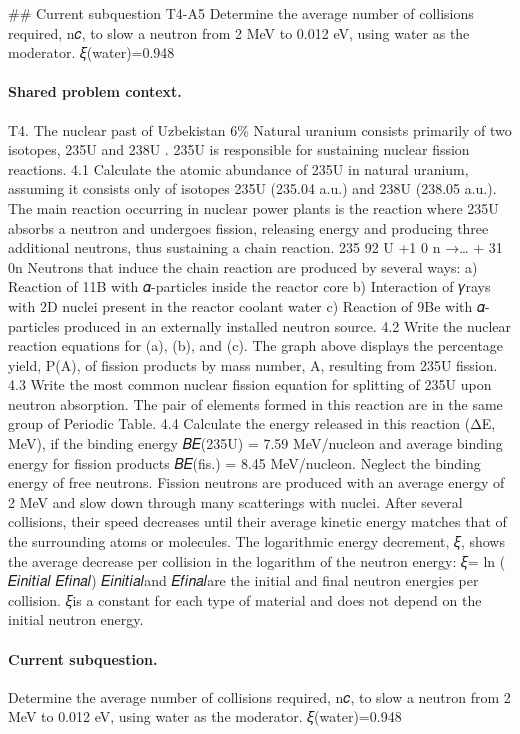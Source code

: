\#\# Current subquestion T4-A5
Determine the average number of collisions required, n𝑐, to slow a neutron from 2 MeV to 0.012 eV, using water as the moderator. 𝜉(water)=0.948

\paragraph{Shared problem context.}
T4. The nuclear past of Uzbekistan 6\% Natural uranium consists primarily of two isotopes, 235U and 238U . 235U is responsible for sustaining nuclear fission reactions. 4.1 Calculate the atomic abundance of 235U in natural uranium, assuming it consists only of isotopes 235U (235.04 a.u.) and 238U (238.05 a.u.). The main reaction occurring in nuclear power plants is the reaction where 235U absorbs a neutron and undergoes fission, releasing energy and producing three additional neutrons, thus sustaining a chain reaction. 235 92 U +1 0 n →… + 31 0n Neutrons that induce the chain reaction are produced by several ways: a) Reaction of 11B with 𝛼-particles inside the reactor core b) Interaction of 𝛾rays with 2D nuclei present in the reactor coolant water c) Reaction of 9Be with 𝛼-particles produced in an externally installed neutron source. 4.2 Write the nuclear reaction equations for (a), (b), and (c). The graph above displays the percentage yield, P(A), of fission products by mass number, A, resulting from 235U fission. 4.3 Write the most common nuclear fission equation for splitting of 235U upon neutron absorption. The pair of elements formed in this reaction are in the same group of Periodic Table. 4.4 Calculate the energy released in this reaction (ΔE, MeV), if the binding energy 𝐵𝐸(235U) = 7.59 MeV/nucleon and average binding energy for fission products 𝐵𝐸(fis.) = 8.45 MeV/nucleon. Neglect the binding energy of free neutrons. Fission neutrons are produced with an average energy of 2 MeV and slow down through many scatterings with nuclei. After several collisions, their speed decreases until their average kinetic energy matches that of the surrounding atoms or molecules. The logarithmic energy decrement, 𝜉, shows the average decrease per collision in the logarithm of the neutron energy: 𝜉= ln ( 𝐸𝑖𝑛𝑖𝑡𝑖𝑎𝑙 𝐸𝑓𝑖𝑛𝑎𝑙) 𝐸𝑖𝑛𝑖𝑡𝑖𝑎𝑙and 𝐸𝑓𝑖𝑛𝑎𝑙are the initial and final neutron energies per collision. 𝜉is a constant for each type of material and does not depend on the initial neutron energy.

\paragraph{Current subquestion.}
Determine the average number of collisions required, n𝑐, to slow a neutron from 2 MeV to 0.012 eV, using water as the moderator. 𝜉(water)=0.948

